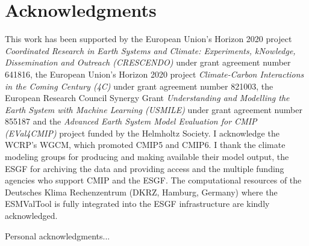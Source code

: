 


\chapter{Acknowledgments}

This work has been supported by the European Union's Horizon 2020 project
\emph{Coordinated Research in Earth Systems and Climate: Experiments,
  kNowledge, Dissemination and Outreach (CRESCENDO)} under grant agreement
number 641816, the European Union's Horizon 2020 project \emph{Climate-Carbon
  Interactions in the Coming Century (4C)} under grant agreement number 821003,
the European Research Council Synergy Grant \emph{Understanding and Modelling
  the Earth System with Machine Learning (USMILE)} under grant agreement number
855187 and the \emph{Advanced Earth System Model Evaluation for CMIP
  (EVal4CMIP)} project funded by the Helmholtz Society. I acknowledge the
\ac{WCRP}'s \ac{WGCM}, which promoted \acs{CMIP}5 and \acs{CMIP}6. I thank the
climate modeling groups for producing and making available their model output,
the \ac{ESGF} for archiving the data and providing access and the multiple
funding agencies who support \ac{CMIP} and the \ac{ESGF}. The computational
resources of the Deutsches Klima Rechenzentrum (DKRZ, Hamburg, Germany) where
the \ac{ESMValTool} is fully integrated into the \ac{ESGF} infrastructure are
kindly acknowledged.

Personal acknowledgments...
